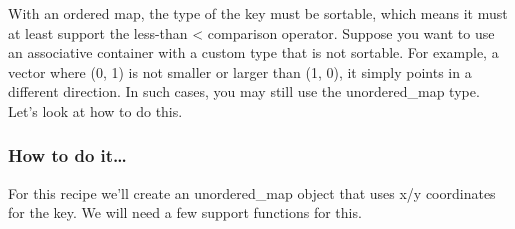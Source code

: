 
With an ordered map, the type of the key must be sortable, which means it must at least support the less-than < comparison operator. Suppose you want to use an associative container with a custom type that is not sortable. For example, a vector where (0, 1) is not smaller or larger than (1, 0), it simply points in a different direction. In such cases, you may still use the unordered\_map type. Let's look at how to do this.

\subsubsection{How to do it…}

For this recipe we'll create an unordered\_map object that uses x/y coordinates for the key. We will need a few support functions for this.

